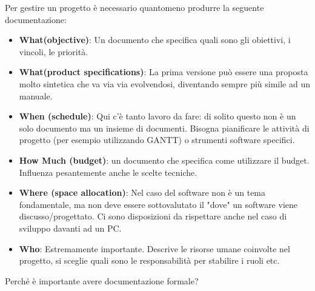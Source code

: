 \noindent Per gestire un progetto è necessario quantomeno produrre la seguente documentazione:
\begin{itemize}
	\item \textbf{What(objective)}: Un documento che specifica quali sono gli obiettivi, i vincoli, le priorità.
	\item \textbf{What(product specifications)}: La prima versione può essere una proposta molto sintetica che va via via evolvendosi, diventando sempre più simile ad un manuale.
	\item \textbf{When (schedule)}: Qui c'è tanto lavoro da fare: di solito questo non è un solo documento ma un insieme di documenti. Bisogna pianificare le attività di progetto (per esempio utilizzando GANTT) o strumenti software specifici.
	\item \textbf{How Much (budget)}: un documento che specifica come utilizzare il budget. Influenza pesantemente anche le scelte tecniche.
	\item \textbf{Where (space allocation)}: Nel caso del software non è un tema fondamentale, ma non deve essere sottovalutato il "dove" un software viene discusso/progettato. Ci sono disposizioni da rispettare anche nel caso di sviluppo davanti ad un PC.
	\item \textbf{Who}: Estremamente importante. Descrive le risorse umane coinvolte nel progetto, si sceglie quali sono le responsabilità per stabilire i ruoli etc.
\end{itemize}
Perché è importante avere documentazione formale?
